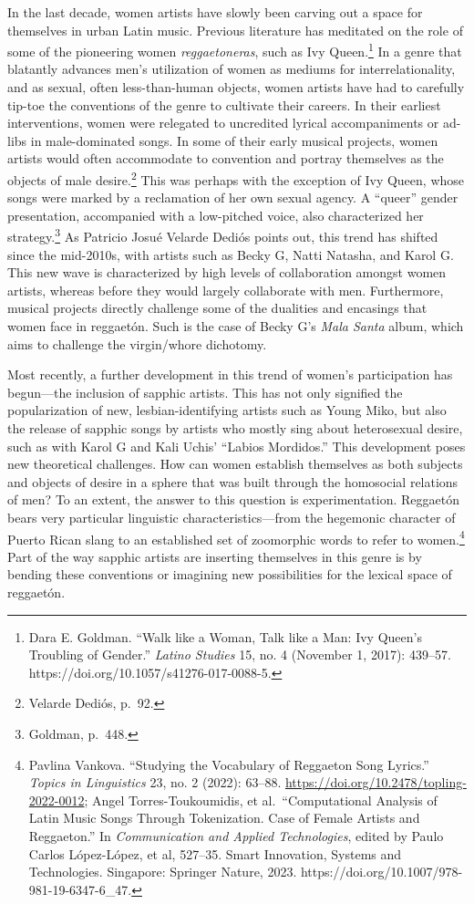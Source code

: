 \documentclass[
  letterpaper,
  DIV=11,
  numbers=noendperiod]{scrartcl}
\begin{document}
In the last decade, women artists have slowly been carving out a space
for themselves in urban Latin music. Previous literature has meditated
on the role of some of the pioneering women \emph{reggaetoneras}, such
as Ivy Queen.\footnote{Dara E. Goldman. ``Walk like a Woman, Talk like a
  Man: Ivy Queen's Troubling of Gender.'' \emph{Latino Studies} 15, no.
  4 (November 1, 2017): 439--57.
  https://doi.org/10.1057/s41276-017-0088-5.} In a genre that blatantly
advances men's utilization of women as mediums for interrelationality,
and as sexual, often less-than-human objects, women artists have had to
carefully tip-toe the conventions of the genre to cultivate their
careers. In their earliest interventions, women were relegated to
uncredited lyrical accompaniments or ad-libs in male-dominated songs. In
some of their early musical projects, women artists would often
accommodate to convention and portray themselves as the objects of male
desire.\footnote{Velarde Dediós, p.~92.} This was perhaps with the
exception of Ivy Queen, whose songs were marked by a reclamation of her
own sexual agency. A ``queer'' gender presentation, accompanied with a
low-pitched voice, also characterized her strategy.\footnote{Goldman,
  p.~448.} As Patricio Josué Velarde Dediós points out, this trend has
shifted since the mid-2010s, with artists such as Becky G, Natti
Natasha, and Karol G. This new wave is characterized by high levels of
collaboration amongst women artists, whereas before they would largely
collaborate with men. Furthermore, musical projects directly challenge
some of the dualities and encasings that women face in reggaetón. Such
is the case of Becky G's \emph{Mala Santa} album, which aims to
challenge the virgin/whore dichotomy.

Most recently, a further development in this trend of women's
participation has begun---the inclusion of sapphic artists. This has not
only signified the popularization of new, lesbian-identifying artists
such as Young Miko, but also the release of sapphic songs by artists who
mostly sing about heterosexual desire, such as with Karol G and Kali
Uchis' ``Labios Mordidos.'' This development poses new theoretical
challenges. How can women establish themselves as both subjects and
objects of desire in a sphere that was built through the homosocial
relations of men? To an extent, the answer to this question is
experimentation. Reggaetón bears very particular linguistic
characteristics---from the hegemonic character of Puerto Rican slang to
an established set of zoomorphic words to refer to women.\footnote{Pavlina
  Vankova. ``Studying the Vocabulary of Reggaeton Song Lyrics.''
  \emph{Topics in Linguistics} 23, no. 2 (2022): 63--88.
  \url{https://doi.org/10.2478/topling-2022-0012}; Angel
  Torres-Toukoumidis, et al.~``Computational Analysis of Latin Music
  Songs Through Tokenization. Case of Female Artists and Reggaeton.'' In
  \emph{Communication and Applied Technologies}, edited by Paulo Carlos
  López-López, et al, 527--35. Smart Innovation, Systems and
  Technologies. Singapore: Springer Nature, 2023.
  https://doi.org/10.1007/978-981-19-6347-6\_47.} Part of the way
sapphic artists are inserting themselves in this genre is by bending
these conventions or imagining new possibilities for the lexical space
of reggaetón.
\end{document}
